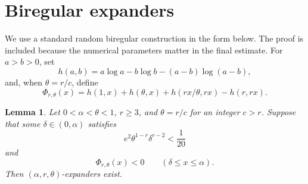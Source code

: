 \documentclass[11pt,a4paper]{amsart}
\newtheorem{lemma}[theorem]{Lemma}
\begin{document}
\section{Biregular expanders}

We use a standard random biregular construction in the form below.  The proof
is included because the numerical parameters matter in the final estimate.
For \(a>b>0\), set
\[
 h(a,b)=a\log a-b\log b-(a-b)\log(a-b),
\]
and, when \(\theta=r/c\), define
\begin{equation}\label{eq:Phi}
 \Phi_{r,\theta}(x)
 =h(1,x)+h(\theta,x)+h(rx/\theta,rx)-h(r,rx).
\end{equation}

\begin{lemma}\label{lem:pippenger}
Let \(0<\alpha<\theta<1\), \(r\geqslant3\), and
\(\theta=r/c\) for an integer \(c>r\).  Suppose that some
\(\delta\in(0,\alpha)\) satisfies
\begin{equation}\label{eq:pippenger-small}
        e^2\theta^{1-r}\delta^{r-2}<\frac1{20}
\end{equation}
and
\begin{equation}\label{eq:pippenger-mid}
        \Phi_{r,\theta}(x)<0\qquad(\delta\leqslant x\leqslant\alpha).
\end{equation}
Then \((\alpha,r,\theta)\)-expanders exist.
\end{lemma}
\end{document}
